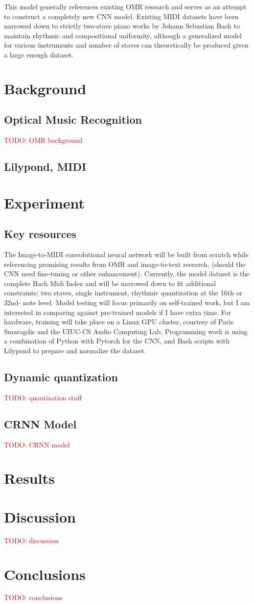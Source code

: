 \documentclass[review,sigconf]{acmart}
\newcommand{\todo}[1]{\textcolor{red}{TODO: #1}}
\begin{document}
This model generally references existing OMR research and serves as an attempt to construct a completely new CNN model. Existing MIDI datasets have been narrowed down to strictly two-stave piano works by Johann Sebastian Bach to maintain rhythmic and compositional uniformity, although a generalized model for various instruments and number of staves can theoretically be produced given a large enough dataset.


\section{Background}
\subsection{Optical Music Recognition}
\todo{OMR background}

\subsection{Lilypond, MIDI}

\section{Experiment}
\subsection{Key resources}
The Image-to-MIDI convolutional neural network will be built from scratch while referencing promising results from OMR and image-to-text research, (should the CNN need fine-tuning or other enhancement). Currently, the model dataset is the complete Bach Midi Index and will be narrowed down to fit additional constraints: two staves, single instrument, rhythmic quantization at the 16th or 32nd- note level. Model testing will focus primarily on self-trained work, but I am interested in comparing against pre-trained models if I have extra time. For hardware, training will take place on a Linux GPU cluster, courtesy of Paris Smaragdis and the UIUC-CS Audio Computing Lab. Programming work is using a combination of Python with Pytorch for the CNN, and Bash scripts with Lilypond to prepare and normalize the dataset.

\subsection{Dynamic quantization}
\todo{quantization stuff}

\subsection{CRNN Model}
\todo{CRNN model}

\section{Results}

\section{Discussion}
\todo{discussion}

\section{Conclusions}
\todo{conclusions}



\end{document}
